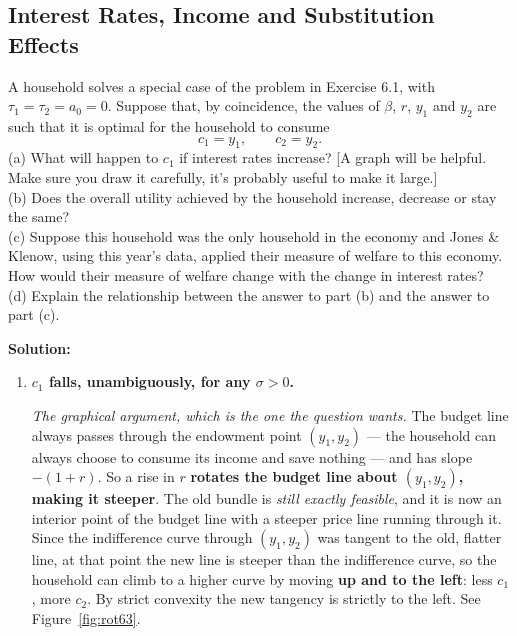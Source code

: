 \documentclass[12pt, letterpaper]{article}
\begin{document}
\subsection{Interest Rates, Income and Substitution Effects}

\begin{tcolorbox}[oddbox,title={Problem 6.3 \quad Consumption and Interest Rates}]
\begin{tcolorbox}[questionbox]
A household solves a special case of the problem in Exercise 6.1, with
$\tau_1=\tau_2=a_0=0$. Suppose that, by coincidence, the values of $\beta$, $r$, $y_1$ and
$y_2$ are such that it is optimal for the household to consume
\[
c_1=y_1,\qquad c_2=y_2 .
\]
(a) What will happen to $c_1$ if interest rates increase? [A graph will be helpful. Make
sure you draw it carefully, it's probably useful to make it large.]\\[3pt]
(b) Does the overall utility achieved by the household increase, decrease or stay the
same?\\[3pt]
(c) Suppose this household was the only household in the economy and Jones \& Klenow, using
this year's data, applied their measure of welfare to this economy. How would their measure
of welfare change with the change in interest rates?\\[3pt]
(d) Explain the relationship between the answer to part (b) and the answer to part (c).
\end{tcolorbox}

\textbf{Solution:}
\begin{enumerate}

\item \textbf{$c_1$ falls, unambiguously, for any $\sigma>0$.}

\smallskip
\emph{The graphical argument, which is the one the question wants.} The budget line always
passes through the endowment point $(y_1,y_2)$ --- the household can always choose to
consume its income and save nothing --- and has slope $-(1+r)$. So a rise in $r$
\textbf{rotates the budget line about $(y_1,y_2)$, making it steeper}. The old bundle is
\emph{still exactly feasible}, and it is now an interior point of the budget line with a
steeper price line running through it. Since the indifference curve through $(y_1,y_2)$ was
tangent to the old, flatter line, at that point the new line is steeper than the
indifference curve, so the household can climb to a higher curve by moving \textbf{up and to
the left}: less $c_1$, more $c_2$. By strict convexity the new tangency is strictly to the
left. See Figure~\ref{fig:rot63}.


\end{enumerate}
\end{tcolorbox}
\end{document}
